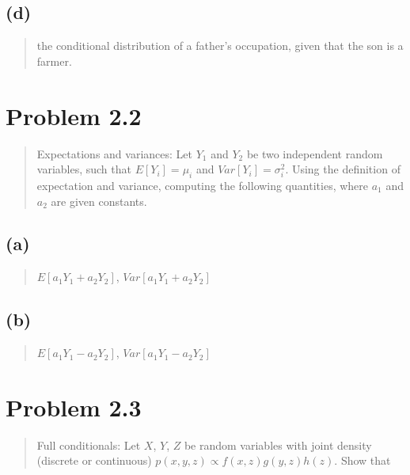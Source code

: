 \documentclass[
  letterpaper,
  DIV=11,
  numbers=noendperiod]{scrreprt}
\begin{document}
\hypertarget{d}{%
\subsection{(d)}\label{d}}

\begin{quote}
the conditional distribution of a father's occupation, given that the
son is a farmer.
\end{quote}

\hypertarget{problem-2.2}{%
\section{Problem 2.2}\label{problem-2.2}}

\begin{quote}
Expectations and variances: Let \(Y_1\) and \(Y_2\) be two independent
random variables, such that \(E[Y_i]=\mu_i\) and
\(Var[Y_i] = \sigma_{i}^2\). Using the definition of expectation and
variance, computing the following quantities, where \(a_1\) and \(a_2\)
are given constants.
\end{quote}

\hypertarget{a-1}{%
\subsection{(a)}\label{a-1}}

\begin{quote}
\(E[a_1 Y_1 +a_2 Y_2]\), \(Var[a_1 Y_1 + a_2 Y_2]\)
\end{quote}

\hypertarget{b-1}{%
\subsection{(b)}\label{b-1}}

\begin{quote}
\(E[a_1 Y_1 - a_2 Y_2]\), \(Var[a_1 Y_1 - a_2 Y_2]\)
\end{quote}

\hypertarget{problem-2.3}{%
\section{Problem 2.3}\label{problem-2.3}}

\begin{quote}
Full conditionals: Let \(X\), \(Y\), \(Z\) be random variables with
joint density (discrete or continuous)
\(p(x,y,z) \propto f(x,z)g(y,z)h(z)\). Show that
\end{quote}
\end{document}
